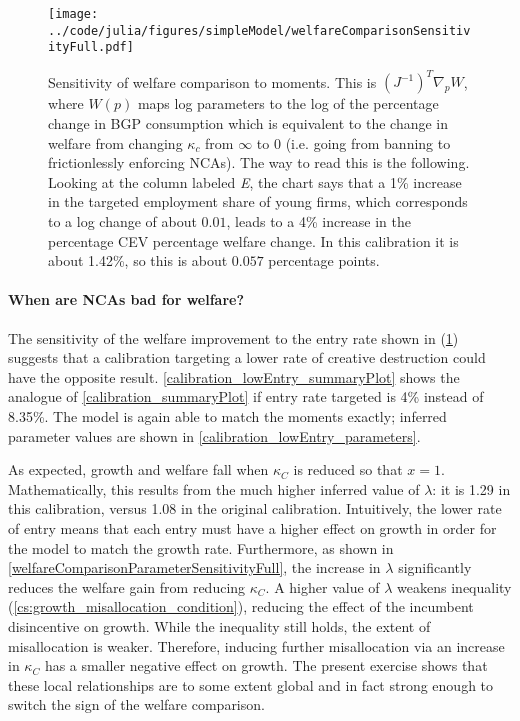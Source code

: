 \documentclass[11pt,english]{article}
\begin{document}
\begin{figure}[]
	\texttt{[image: ../code/julia/figures/simpleModel/welfareComparisonSensitivityFull.pdf]}
	\caption{Sensitivity of welfare comparison to moments. This is $(J^{-1})^T \nabla_p W$, where $W(p)$ maps log parameters to the log of the percentage change in BGP consumption which is equivalent to the change in welfare from changing $\kappa_c$ from $\infty$ to $0$ (i.e. going from banning to frictionlessly enforcing NCAs). The way to read this is the following. Looking at the column labeled \textit{E}, the chart says that a 1\% increase in the targeted employment share of young firms, which corresponds to a log change of about $0.01$, leads to a 4\% increase in the percentage CEV percentage welfare change. In this calibration it is about 1.42\%, so this is about $0.057$ percentage points.}
	\label{welfareComparisonSensitivityFull}
\end{figure}


\paragraph{When are NCAs bad for welfare?}

The sensitivity of the welfare improvement to the entry rate shown in (\ref{welfareComparisonSensitivityFull}) suggests that a calibration targeting a lower rate of creative destruction could have the opposite result. \autoref{calibration_lowEntry_summaryPlot} shows the analogue of \autoref{calibration_summaryPlot} if entry rate targeted is 4\% instead of 8.35\%. The model is again able to match the moments exactly; inferred parameter values are shown in \autoref{calibration_lowEntry_parameters}.

As expected, growth and welfare fall when $\kappa_C$ is reduced so that $x = 1$. Mathematically, this results from the much higher inferred value of $\lambda$: it is 1.29 in this calibration, versus 1.08 in the original calibration. Intuitively, the lower rate of entry means that each entry must have a higher effect on growth in order for the model to match the growth rate. Furthermore, as shown in \autoref{welfareComparisonParameterSensitivityFull}, the increase in $\lambda$ significantly reduces the welfare gain from reducing $\kappa_C$. A higher value of $\lambda$ weakens inequality (\ref{cs:growth_misallocation_condition}), reducing the effect of the incumbent disincentive on growth. While the inequality still holds, the extent of misallocation is weaker. Therefore, inducing further misallocation via an increase in $\kappa_C$ has a smaller negative effect on growth. The present exercise shows that these local relationships are to some extent global and in fact strong enough to switch the sign of the welfare comparison.
\end{document}
